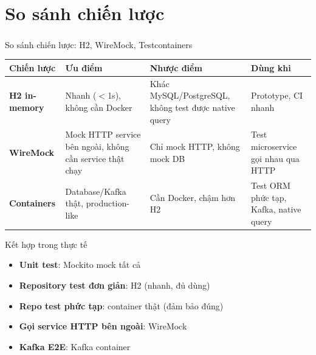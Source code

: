\documentclass[aspectratio=169,10pt]{beamer}
\newcommand{\sref}[1]{\textsuperscript{\scriptsize\cite{#1}}}
\begin{document}
\section{So sánh chiến lược}

\begin{frame}{So sánh chiến lược: H2, WireMock, Testcontainers\sref{testcontainers}}
  \begin{center}
  \small
  \begin{tabular}{p{2cm}p{3.5cm}p{3.5cm}p{2cm}}
    \toprule
    \textbf{Chiến lược} & \textbf{Ưu điểm} & \textbf{Nhược điểm} & \textbf{Dùng khi} \\
    \midrule
    \textbf{H2 in-memory} &
    Nhanh ($<$1s), không cần Docker &
    Khác MySQL/PostgreSQL, không test được native query &
    Prototype, CI nhanh \\
    \textbf{WireMock} &
    Mock HTTP service bên ngoài, không cần service thật chạy &
    Chỉ mock HTTP, không mock DB &
    Test microservice gọi nhau qua HTTP \\
    \textbf{Containers} &
    Database/Kafka thật, production-like &
    Cần Docker, chậm hơn H2 &
    Test ORM phức tạp, Kafka, native query \\
    \bottomrule
  \end{tabular}
  \end{center}

  \vspace{0.3em}
  \begin{exampleblock}{Kết hợp trong thực tế}
    \begin{itemize}
      \item \textbf{Unit test}: Mockito mock tất cả
      \item \textbf{Repository test đơn giản}: H2 (nhanh, đủ dùng)
      \item \textbf{Repo test phức tạp}: container thật (đảm bảo đúng)
      \item \textbf{Gọi service HTTP bên ngoài}: WireMock
      \item \textbf{Kafka E2E}: Kafka container
    \end{itemize}
  \end{exampleblock}
\end{frame}
\end{document}
